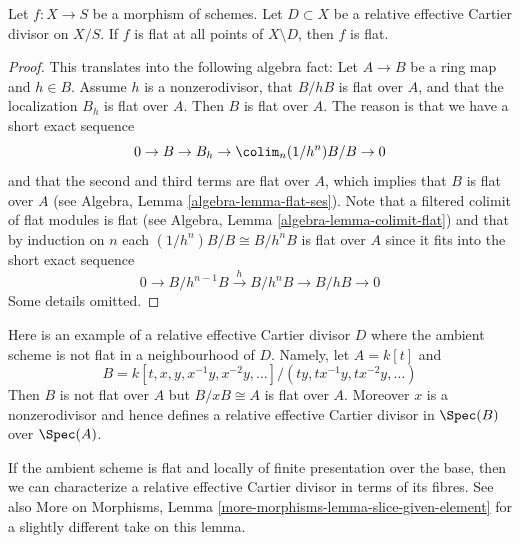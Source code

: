 \begin{lemma}
\label{lemma-michael-artin}
Let $f : X \to S$ be a morphism of schemes.
Let $D \subset X$ be a relative effective Cartier divisor on $X/S$.
If $f$ is flat at all points of $X \setminus D$, then $f$ is flat.
\end{lemma}

\begin{proof}
This translates into the following algebra fact:
Let $A \to B$ be a ring map and $h \in B$.
Assume $h$ is a nonzerodivisor, that $B/hB$ is flat over $A$, and
that the localization $B_h$ is flat over $A$. Then $B$ is flat over $A$.
The reason is that we have a short exact sequence
$$
0 \to B \to B_h \to \colim_n (1/h^n)B/B \to 0
$$
and that the second and third terms are flat over $A$, which implies
that $B$ is flat over $A$ (see
Algebra, Lemma \ref{algebra-lemma-flat-ses}). Note that a filtered
colimit of flat modules is flat (see
Algebra, Lemma \ref{algebra-lemma-colimit-flat})
and that by induction on $n$ each $(1/h^n)B/B \cong B/h^nB$ is flat over
$A$ since it fits into the short exact sequence
$$
0 \to B/h^{n - 1}B \xrightarrow{h} B/h^nB \to B/hB \to 0
$$
Some details omitted.
\end{proof}

\begin{example}
\label{example-relative-cartier-ambient-space-not-flat}
Here is an example of a relative effective Cartier divisor $D$ where the
ambient scheme is not flat in a neighbourhood of $D$. Namely, let
$A = k[t]$ and
$$
B = k[t, x, y, x^{-1}y, x^{-2}y, \ldots]/(ty, tx^{-1}y, tx^{-2}y, \ldots)
$$
Then $B$ is not flat over $A$ but $B/xB \cong A$ is flat over $A$.
Moreover $x$ is a nonzerodivisor and hence defines a relative effective
Cartier divisor in $\Spec(B)$ over $\Spec(A)$.
\end{example}

\noindent
If the ambient scheme is flat and locally of finite presentation over
the base, then we can characterize a relative effective Cartier divisor
in terms of its fibres. See also
More on Morphisms, Lemma \ref{more-morphisms-lemma-slice-given-element}
for a slightly different take on this lemma.

